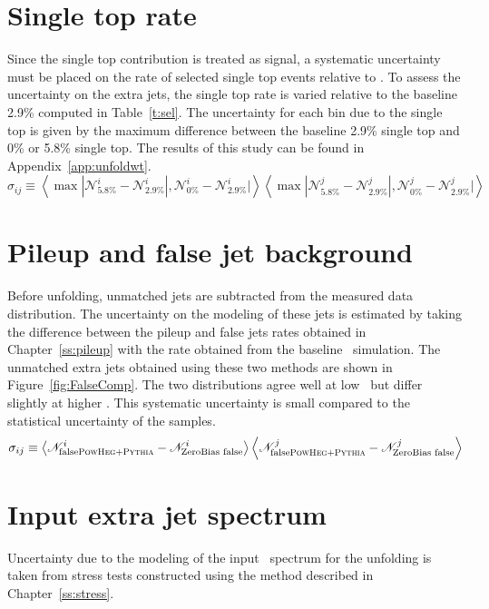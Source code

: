 \section{Single top rate}
\label{ss:wt}
Since the single top contribution is treated as signal, a systematic uncertainty must be placed on the rate of selected single top events relative to \ttbar.  To assess the uncertainty on the extra jets, the single top rate is varied relative to the baseline 2.9\% computed in Table~\ref{t:sel}. The uncertainty for each bin due to the single top is given by the maximum difference between the baseline 2.9\% single top and 0\% or 5.8\%  single top. The results of this study can be found in Appendix~\ref{app:unfoldwt}.
\begin{displaymath}
\sigma_{ij}\equiv \left \langle \max {|{\mathscr N}_{5.8\%}^i-{\mathscr N}_{2.9\%}^i|, {\mathscr N}_{0\%}^i-{\mathscr N}_{2.9\%}^i|} \right \rangle \left \langle \max {|{\mathscr N}_{5.8\%}^j-{\mathscr N}_{2.9\%}^j|, {\mathscr N}_{0\%}^j-{\mathscr N}_{2.9\%}^j|} \right \rangle
\end{displaymath}

\section{Pileup and false jet background}
\label{ss:sysbkg}
Before unfolding, unmatched jets are subtracted from the measured data distribution. The uncertainty on the modeling of these jets is estimated 
by taking the difference between the pileup and false jets rates obtained in Chapter~\ref{ss:pileup} with the
rate obtained from the baseline \powpy\ simulation.
The unmatched extra jets obtained using these two methods are shown in Figure~\ref{fig:FalseComp}. 
The two distributions agree well at low \pt\ but differ slightly at higher \pt. This systematic uncertainty is small compared to the statistical uncertainty of the samples.
\begin{displaymath}
\sigma_{ij} \equiv \left \langle {\mathscr N}^{i}_{\textrm{false} \textsc{PowHeg+Pythia} }-{\mathscr N}^{i}_{\textrm{ZeroBias~false}} \right \rangle \left \langle {\mathscr N}^{j}_{\textrm{false} \textsc{PowHeg+Pythia} }-{\mathscr N}^{j}_{\textrm{ZeroBias~false}} \right \rangle
\end{displaymath}
\section{Input extra jet spectrum}
\label{ss:unfsystt}
Uncertainty due to the modeling of the input \ttbar\ spectrum for the unfolding is taken from stress tests constructed using the method described in Chapter~\ref{ss:stress}.

